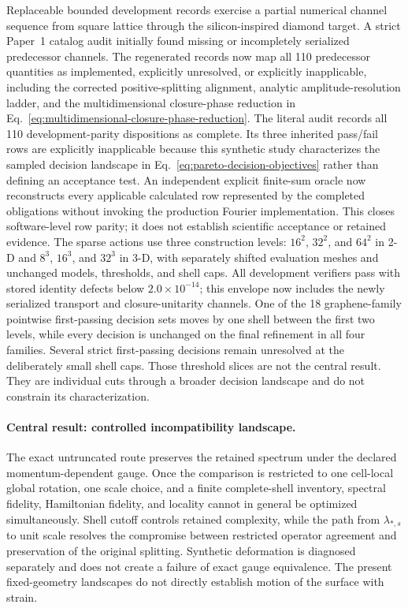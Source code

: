 \documentclass[11pt]{article}
\newenvironment{prospective}{\color{prospectivered}}{}
\begin{document}
\begin{prospective}
Replaceable bounded development records exercise a partial numerical channel sequence
from square lattice through the silicon-inspired diamond target. A strict Paper~1
catalog audit initially found missing or incompletely serialized predecessor channels.
The regenerated records now map all 110 predecessor quantities as implemented,
explicitly unresolved, or explicitly inapplicable, including the corrected
positive-splitting alignment, analytic amplitude-resolution ladder, and the
multidimensional closure-phase reduction in
Eq.~\eqref{eq:multidimensional-closure-phase-reduction}. The literal audit records all
110 development-parity dispositions as complete. Its three inherited pass/fail rows are
explicitly inapplicable because this synthetic study characterizes the sampled decision
landscape in Eq.~\eqref{eq:pareto-decision-objectives} rather than defining an acceptance
test. An independent
explicit finite-sum oracle now reconstructs every applicable calculated row represented
by the completed obligations without invoking the production Fourier implementation.
This closes software-level row parity; it does not establish scientific acceptance or
retained evidence. The sparse actions use three construction levels: $16^2$, $32^2$,
and $64^2$ in 2-D and $8^3$, $16^3$, and $32^3$ in 3-D, with separately shifted
evaluation meshes and unchanged models, thresholds, and shell caps. All development
verifiers pass with stored identity defects below $2.0\times10^{-14}$; this envelope now
includes the newly serialized transport and closure-unitarity channels. One of the 18
graphene-family pointwise first-passing decision sets moves by one shell between the
first two levels, while every decision is unchanged on the final refinement in all four
families. Several strict first-passing decisions remain unresolved at the deliberately small
shell caps. Those threshold slices are not the central result. They are individual cuts
through a broader decision landscape and do not constrain its characterization.

\paragraph{Central result: controlled incompatibility landscape.}
The exact untruncated route preserves the retained spectrum under the declared
momentum-dependent gauge. Once the comparison is restricted to one cell-local global
rotation, one scale choice, and a finite complete-shell inventory, spectral fidelity,
Hamiltonian fidelity, and locality cannot in general be optimized simultaneously.
Shell cutoff controls retained complexity, while the path from $\lambda_{*,s}$ to unit
scale resolves the compromise between restricted operator agreement and preservation of
the original splitting. Synthetic deformation is diagnosed separately and does not
create a failure of exact gauge equivalence. The present fixed-geometry landscapes do
not directly establish motion of the surface with strain.


\end{prospective}
\end{document}
